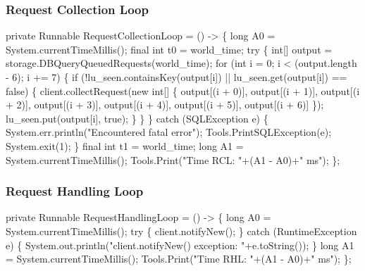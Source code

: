 \documentclass{article}
\def\nwendcode{\endtrivlist \endgroup}      %
\let\nwdocspar=\par
\begin{document}
\subsubsection{Request Collection Loop}
\nwenddocs{}\endmoddef{}
private Runnable RequestCollectionLoop = () -> \{
  long A0 = System.currentTimeMillis();
  final int t0 = world_time;
  try \{
    int[] output = storage.DBQueryQueuedRequests(world_time);
    for (int i = 0; i < (output.length - 6); i += 7) \{
      if (!lu_seen.containsKey(output[i]) || lu_seen.get(output[i]) == false) \{
        client.collectRequest(new int[] \{
          output[(i + 0)],
          output[(i + 1)],
          output[(i + 2)],
          output[(i + 3)],
          output[(i + 4)],
          output[(i + 5)],
          output[(i + 6)] \});
        lu_seen.put(output[i], true);
      \}
    \}
  \} catch (SQLException e) \{
    System.err.println("Encountered fatal error");
    Tools.PrintSQLException(e);
    System.exit(1);
  \}
  final int t1 = world_time;
  long A1 = System.currentTimeMillis();
  Tools.Print("Time RCL: "+(A1 - A0)+" ms");
\};
\eatline
{}\nwendcode{}\nwdocspar
\subsubsection{Request Handling Loop}
\nwenddocs{}\endmoddef{}
private Runnable RequestHandlingLoop = () -> \{
  long A0 = System.currentTimeMillis();
  try \{
    client.notifyNew();
  \} catch (RuntimeException e) \{
    System.out.println("client.notifyNew() exception: "+e.toString());
  \}
  long A1 = System.currentTimeMillis();
  Tools.Print("Time RHL: "+(A1 - A0)+" ms");
\};
\eatline
{}\nwendcode{}\nwdocspar
\end{document}
